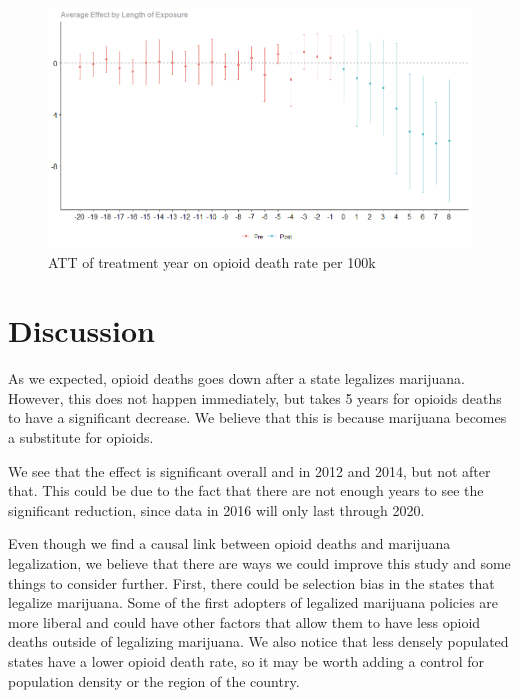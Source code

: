 \documentclass{article}
\begin{document}
\begin{figure}
    \begin{center}
        \includegraphics[width=.85\textwidth]{sc_graph.png}
    \end{center}
    \caption{ATT of treatment year on opioid death rate per 100k}
    \label{fig:graph}
\end{figure}





\section*{Discussion}

As we expected, opioid deaths goes down after a state legalizes marijuana. However, this does not happen immediately, but takes 5 years for opioids deaths to have a significant decrease. We believe that this is because marijuana becomes a substitute for opioids. 

We see that the effect is significant overall and in 2012 and 2014, but not after that. This could be due to the fact that there are not enough years to see the significant reduction, since data in 2016 will only last through 2020. 

Even though we find a causal link between opioid deaths and marijuana legalization, we believe that there are ways we could improve this study and some things to consider further. First, there could be selection bias in the states that legalize marijuana. Some of the first adopters of legalized marijuana policies are more liberal and could have other factors that allow them to have less opioid deaths outside of legalizing marijuana. We also notice that less densely populated states have a lower opioid death rate, so it may be worth adding a control for population density or the region of the country.
\end{document}
